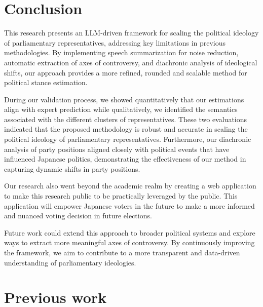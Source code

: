 \documentclass[final,5p,times,twocolumn,authoryear]{elsarticle}
\begin{document}
\section{Conclusion}
This research presents an LLM-driven framework for scaling the political ideology of parliamentary representatives, addressing key limitations in previous methodologies. By implementing speech summarization for noise reduction, automatic extraction of axes of controversy, and diachronic analysis of ideological shifts, our approach provides a more refined, rounded and scalable method for political stance estimation. 

During our validation process, we showed quantitatively that our estimations align with expert prediction while qualitatively, we identified the semantics associated with the different clusters of representatives. These two evaluations indicated that the proposed methodology is robust and accurate in scaling the political ideology of parliamentary representatives. Furthermore, our diachronic analysis of party positions aligned closely with political events that have influenced Japanese politics, demonstrating the effectiveness of our method in capturing dynamic shifts in party positions.

Our research also went beyond the academic realm by creating a web application to make this research public to be practically leveraged by the public. This application will empower Japanese voters in the future to make a more informed and nuanced voting decision in future elections.

Future work could extend this approach to broader political systems and explore ways to extract more meaningful axes of controversy. By continuously improving the framework, we aim to contribute to a more transparent and data-driven understanding of parliamentary ideologies.


\FloatBarrier
\newpage
\appendix
\section{Previous work}
\end{document}

